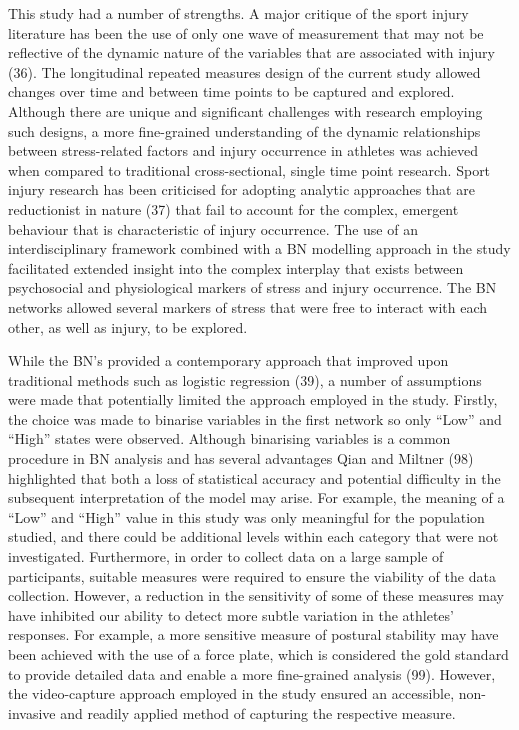 \documentclass[
  english,
  man]{apa6}
\begin{document}
This study had a number of strengths. A major critique of the sport injury literature has been the use of only one wave of measurement that may not be reflective of the dynamic nature of the variables that are associated with injury (36).
The longitudinal repeated measures design of the current study allowed changes over time and between time points to be captured and explored.
Although there are unique and significant challenges with research employing such designs, a more fine-grained understanding of the dynamic relationships between stress-related factors and injury occurrence in athletes was achieved when compared to traditional cross-sectional, single time point research.
Sport injury research has been criticised for adopting analytic approaches that are reductionist in nature (37) that fail to account for the complex, emergent behaviour that is characteristic of injury occurrence. The use of an interdisciplinary framework combined with a BN modelling approach in the study facilitated extended insight into the complex interplay that exists between psychosocial and physiological markers of stress and injury occurrence.
The BN networks allowed several markers of stress that were free to interact with each other, as well as injury, to be explored.

While the BN's provided a contemporary approach that improved upon traditional methods such as logistic regression (39), a number of assumptions were made that potentially limited the approach employed in the study.
Firstly, the choice was made to binarise variables in the first network so only ``Low'' and ``High'' states were observed. Although binarising variables is a common procedure in BN analysis and has several advantages Qian and Miltner (98) highlighted that both a loss of statistical accuracy and potential difficulty in the subsequent interpretation of the model may arise.
For example, the meaning of a ``Low'' and ``High'' value in this study was only meaningful for the population studied, and there could be additional levels within each category that were not investigated.
Furthermore, in order to collect data on a large sample of participants, suitable measures were required to ensure the viability of the data collection. However, a reduction in the sensitivity of some of these measures may have inhibited our ability to detect more subtle variation in the athletes' responses.
For example, a more sensitive measure of postural stability may have been achieved with the use of a force plate, which is considered the gold standard to provide detailed data and enable a more fine-grained analysis (99).
However, the video-capture approach employed in the study ensured an accessible, non-invasive and readily applied method of capturing the respective measure.
\end{document}
